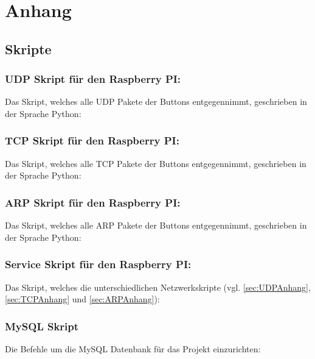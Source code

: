 \section{Anhang}
\subsection{Skripte}
\label{sec:Skripte-1} 

\subsubsection{\ac{UDP} Skript für den Raspberry PI:}$\;$ \\  
\label{sec:UDPAnhang}
Das Skript, welches alle \ac{UDP} Pakete der Buttons entgegennimmt, geschrieben in der Sprache Python:

\newpage

\subsubsection{\ac{TCP} Skript für den Raspberry PI:}$\;$ \\  
\label{sec:TCPAnhang}
Das Skript, welches alle \ac{TCP} Pakete der Buttons entgegennimmt, geschrieben in der Sprache Python:

\newpage

\subsubsection{\ac{ARP} Skript für den Raspberry PI:}$\;$ \\  
\label{sec:ARPAnhang}
Das Skript, welches alle \ac{ARP} Pakete der Buttons entgegennimmt, geschrieben in der Sprache Python:

\newpage

\subsubsection{Service Skript für den Raspberry PI:}$\;$ \\
\label{sec:ServiceAnhang}
Das Skript, welches die unterschiedlichen Netzwerkskripte (vgl. \ref{sec:UDPAnhang}, \ref{sec:TCPAnhang} und \ref{sec:ARPAnhang}):

\newpage

\subsubsection{MySQL Skript}
\label{sec:MySQLSkript}
Die Befehle um die MySQL Datenbank für das Projekt einzurichten: 

\newpage 

